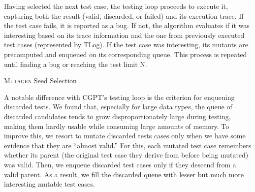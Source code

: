 \documentclass[sigconf,review,anonymous]{acmart}
\newcommand{\mutagen}{\textsc{Mutagen}\xspace}
\begin{document}
Having selected the next test case, the testing loop proceeds to execute it,
capturing both the result (valid, discarded, or failed) and its execution trace.
%
If the test case fails, it is reported as a bug.
%
If not, the algorithm evaluates if it was interesting based on its trace
information and the one from previously executed test cases (represented by
TLog).
%
If the test case was interesting, its mutants are precomputed and enqueued on its
corresponding queue.
%
%
This process is repeated until finding a bug or reaching the test limit N.


\begin{algorithm}[t]
  \SetAlgoLined
  \DontPrintSemicolon
  \caption{\label{algo:mutagen:pick}\mutagen Seed Selection}
\end{algorithm}

A notable difference with CGPT's testing loop is the criterion for enqueuing
discarded tests.
%
We found that, especially for large data types, the queue of discarded
candidates tends to grow disproportionately large during testing, making them
hardly usable while consuming large amounts of memory.
%
To improve this, we resort to mutate discarded tests cases only when we have
some evidence that they are ``almost valid.''
%
For this, each mutated test case remembers whether its parent (the original test
case they derive from before being mutated) was valid.
%
Then, we enqueue discarded test cases only if they descend from a valid parent.
%
As a result, we fill the discarded queue with lesser but much more interesting
mutable test cases.
\end{document}
